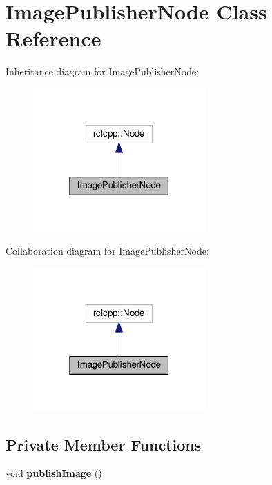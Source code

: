\hypertarget{classImagePublisherNode}{}\section{Image\+Publisher\+Node Class Reference}
\label{classImagePublisherNode}


Inheritance diagram for Image\+Publisher\+Node\+:
\nopagebreak
\begin{figure}[H]
\begin{center}
\leavevmode
\includegraphics[width=187pt]{classImagePublisherNode__inherit__graph}
\end{center}
\end{figure}


Collaboration diagram for Image\+Publisher\+Node\+:
\nopagebreak
\begin{figure}[H]
\begin{center}
\leavevmode
\includegraphics[width=187pt]{classImagePublisherNode__coll__graph}
\end{center}
\end{figure}
\subsection*{Private Member Functions}
\begin{DoxyCompactItemize}
\item 
\mbox{\label{classImagePublisherNode_a28d8c880f34aa4ff0fe12f9a83db775e}} 
void {\bfseries publish\+Image} ()
\end{DoxyCompactItemize}
